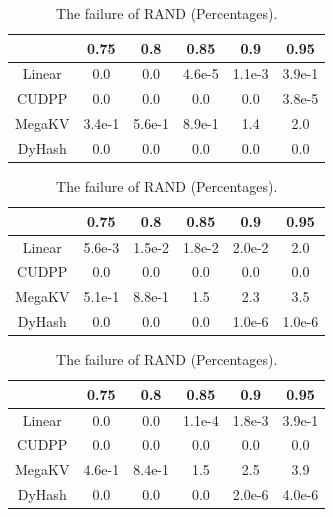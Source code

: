 \begin{table}[ht]\centering
	\begin{minipage}{0.45\linewidth}\centering
		\caption{The failure of TW (Percentages).}
		\begin{tabular}{|c|c|c|c|c|c|}
			\hline
			& 0.75 & 0.8 & 0.85 & 0.9 & 0.95\\ \hline
			Linear &0.0 & 0.0 &4.6e-5  & 1.1e-3 & 3.9e-1 \\ \hline
			CUDPP & 0.0 & 0.0 &0.0  & 0.0 & 3.8e-5 \\ \hline
			MegaKV & 3.4e-1 & 5.6e-1 &8.9e-1 & 1.4 & 2.0 \\ \hline
			DyHash &0.0 & 0.0 &0.0  & 0.0 & 0.0 \\ \hline
		\end{tabular}
		\label{tab:fail:tw}
	\end{minipage}
	\begin{minipage}{0.45\linewidth}\centering
		\caption{The failure of RE (Percentages).}
		\begin{tabular}{|c|c|c|c|c|c|}
			\hline
			& 0.75 & 0.8 & 0.85 & 0.9 & 0.95\\ \hline
			Linear &5.6e-3 & 1.5e-2 &1.8e-2  & 2.0e-2 & 2.0 \\ \hline
			CUDPP & 0.0 & 0.0 &0.0  & 0.0 & 0.0 \\ \hline
			MegaKV &5.1e-1 & 8.8e-1 &1.5  & 2.3 & 3.5 \\ \hline
			DyHash &0.0 & 0.0 &0.0  & 1.0e-6 & 1.0e-6 \\ \hline
		\end{tabular}
		\label{tab:fail:re}
	\end{minipage}
	\begin{minipage}{0.45\linewidth}\centering
		\caption{The failure of LINE (Percentages).}
		\begin{tabular}{|c|c|c|c|c|c|}
			\hline
			& 0.75 & 0.8 & 0.85 & 0.9 & 0.95\\ \hline
			Linear &0.0 & 0.0 &1.1e-4  & 1.8e-3 & 3.9e-1 \\ \hline
			CUDPP & 0.0 & 0.0 &0.0  & 0.0 & 0.0 \\ \hline
			MegaKV &4.6e-1 & 8.4e-1 &1.5  & 2.5 & 3.9 \\ \hline
			DyHash &0.0 & 0.0 &0.0  & 2.0e-6 & 4.0e-6 \\ \hline
		\end{tabular}
		\label{tab:fail:line}
	\end{minipage}
	\begin{minipage}{0.45\linewidth}\centering
		\caption{The failure of RAND (Percentages).}

\end{minipage}
\end{table}
